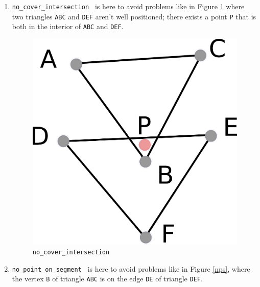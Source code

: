 \documentclass[a4paper,10pt]{article}
\def\ttt#1#2{{\tt{\color{black}#1} #2}}
\begin{document}
\begin{enumerate}
\item \ttt{no\_cover\_intersection}{} is here to avoid problems like in Figure \ref{nci} where two triangles {\tt ABC} and {\tt DEF} aren't well positioned; there exists a point {\tt P} that is both in the interior of {\tt ABC} and {\tt DEF}.
\begin{figure}
\centering
\includegraphics[scale=2]{nci}
\caption{\label{nci} {\tt no\_cover\_intersection}}
\end{figure}
\item \ttt{no\_point\_on\_segment}{} is here to avoid problems like in Figure \ref{nps}, where the vertex {\tt B} of triangle {\tt ABC} is on the edge {\tt DE} of triangle {\tt DEF}.
\\
\begin{figure}
\centering

\end{figure}
\end{enumerate}
\end{document}
